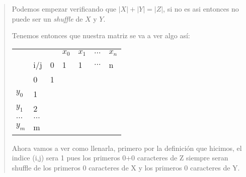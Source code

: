 \begin{quote}

    Podemos empezar verificando que $|X|+|Y|=|Z|$, si no es asi entonces
    no puede ser un \textit{shuffle} de $X$ y $Y$. \vspace{.2cm}

    Tenemos entonces que nuestra matriz se va a ver algo as\'i:

    \begin{table}[H]
        \centering
        \begin{tabular}{lllllll}
                &                              &                       & $x_0$                 & $x_1$                 & $\dots$               & $x_n$                 \\
                & i/j                          & 0                     & 1                     & 1                     & $\dots$               & n                     \\ \cline{3-7} 
                & \multicolumn{1}{l|}{0}       & \multicolumn{1}{l|}{1} & \multicolumn{1}{l|}{} & \multicolumn{1}{l|}{} & \multicolumn{1}{l|}{} & \multicolumn{1}{l|}{} \\ \cline{3-7} 
        $y_0$   & \multicolumn{1}{l|}{1}       & \multicolumn{1}{l|}{} & \multicolumn{1}{l|}{} & \multicolumn{1}{l|}{} & \multicolumn{1}{l|}{} & \multicolumn{1}{l|}{} \\ \cline{3-7} 
        $y_1$   & \multicolumn{1}{l|}{2}       & \multicolumn{1}{l|}{} & \multicolumn{1}{l|}{} & \multicolumn{1}{l|}{} & \multicolumn{1}{l|}{} & \multicolumn{1}{l|}{} \\ \cline{3-7} 
        $\dots$ & \multicolumn{1}{l|}{$\dots$} & \multicolumn{1}{l|}{} & \multicolumn{1}{l|}{} & \multicolumn{1}{l|}{} & \multicolumn{1}{l|}{} & \multicolumn{1}{l|}{} \\ \cline{3-7} 
        $y_m$   & \multicolumn{1}{l|}{m}       & \multicolumn{1}{l|}{} & \multicolumn{1}{l|}{} & \multicolumn{1}{l|}{} & \multicolumn{1}{l|}{} & \multicolumn{1}{l|}{} \\ \cline{3-7} 
        \end{tabular}
    \end{table}

    Ahora vamos a ver como llenarla, primero por la definición que hicimos, el indice
    (i,j) sera 1 pues los primeros 0+0 caracteres de Z siempre seran shuffle de los primeros
    0 caracteres de X y los primeros 0 caracteres de Y. \vspace{.2cm}


\end{quote}
